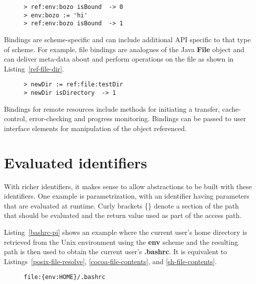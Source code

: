 \documentclass[preprint,authoryear]{acm_proc_article-sp}
\begin{document}
\begin{figure}[htbp]
\begin{lstlisting}[style=L,label=isBound,caption=Is environment variable set?]
> ref:env:bozo isBound  -> 0
> env:bozo := 'hi'
> ref:env:bozo isBound  -> 1
\end{lstlisting}
\end{figure}

Bindings are scheme-specific and can include additional API specific to that type of scheme.
For example, file bindings are analogues of the Java {\bf File} object and can deliver
meta-data about and perform operations on the file as shown in Listing~\ref{ref-file-dir}.


\begin{figure}[htbp]
\begin{lstlisting}[style=L,label=ref-file-dir,caption=File and directory manipulation.]
> newDir := ref:file:testDir 
> newDir isDirectory  -> 1
\end{lstlisting}
\end{figure}

Bindings for remote resources include methods for initiating a transfer, cache-control,
error-checking and progress monitoring.   Bindings can be passed to user interface
elements for manipulation of the object referenced.




\section{Evaluated identifiers}

With richer identifiers, it makes sense to allow abstractions to be built with these identifiers.
One example is parametrization, with an identifier having parameters that are evaluated
at runtime.  Curly brackets \{\} denote a section of the path that should be evaluated and
the return value used as part of the access path.

Listing~\ref{bashrc-pi} shows an example where the current user's home directory
is retrieved from the Unix environment using the {\bf env} scheme and the resulting
path is then used to obtain the current user's  {\bf .bashrc}.
It is equivalent to Listings~\ref{posix-file-resolve}, \ref{cocoa-file-contents}, and 
\ref{sh-file-contents}.

\begin{figure}[htbp]
\begin{lstlisting}[style=L,label=bashrc-pi,caption=Parametrized identifier.]
  file:{env:HOME}/.bashrc
\end{lstlisting}
\end{figure}
\end{document}
